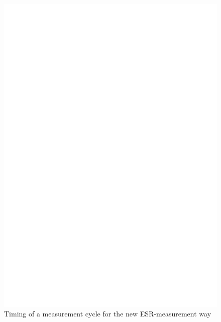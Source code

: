 \begin{figure}[H]
  \centering
    \includegraphics[width=18cm]{../FIG/Cap_esr2_timing.eps}
  \caption{Timing of a measurement cycle for the new ESR-measurement way}
  \label{fig:Cap_esr2_timing}
\end{figure}

